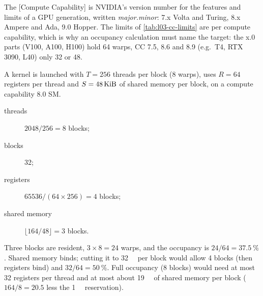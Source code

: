 \documentclass[../main.tex]{subfiles}
\begin{document}
\begin{definition}
  The [Compute Capability] is NVIDIA's version
  number for the features and limits of a GPU generation, written
  \emph{major.minor}: 7.x Volta and Turing, 8.x Ampere and Ada, 9.0
  Hopper.  The limits of \cref{tab:l03-cc-limits} are per compute
  capability, which is why an occupancy calculation must name the
  target: the x.0 parts (V100, A100, H100) hold 64 warps, CC 7.5, 8.6
  and 8.9 (e.g.\ T4, RTX 3090, L40) only 32 or 48.
\end{definition}

\begin{example}[Occupancy on an A100]
  \label{ex:l03-occupancy-a100}
  A kernel is launched with $T = 256$ threads per block (8 warps), uses
  $R = 64$ registers per thread and $S = \SI{48}{\kibi\byte}$ of shared
  memory per block, on a compute capability 8.0 SM.
  \begin{description}
    \item[threads] $2048 / 256 = 8$ blocks;
    \item[blocks] 32;
    \item[registers] $\num{65536} / (64 \times 256) = 4$ blocks;
    \item[shared memory] $\lfloor 164 / 48 \rfloor = 3$ blocks.
  \end{description}
  Three blocks are resident, $3 \times 8 = 24$ warps, and the occupancy is
  $24 / 64 = \SI{37.5}{\percent}$.  Shared memory binds; cutting it to
  \SI{32}{\kibi\byte} per block would allow 4 blocks (then registers bind)
  and $32/64 = \SI{50}{\percent}$.  Full occupancy (8 blocks) would need
  at most 32 registers per thread and at most about \SI{19}{\kibi\byte}
  of shared memory per block ($164/8 = 20.5$ less the
  \SI{1}{\kibi\byte} reservation).
\end{example}
\end{document}
